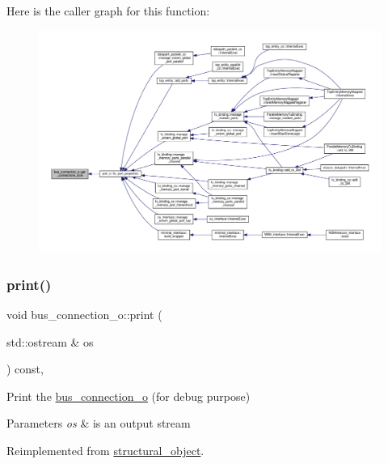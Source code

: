 Here is the caller graph for this function\+:
\nopagebreak
\begin{figure}[H]
\begin{center}
\leavevmode
\includegraphics[width=350pt]{d3/dfb/classbus__connection__o_a33bc2eb332f138bce27623ab76ce1305_icgraph}
\end{center}
\end{figure}
\mbox{\label{classbus__connection__o_ae96b465789da7122ed409f31bc43421a}} 
\subsubsection{\texorpdfstring{print()}{print()}}
{\footnotesize\ttfamily void bus\+\_\+connection\+\_\+o\+::print (\begin{DoxyParamCaption}\item[{std\+::ostream \&}]{os }\end{DoxyParamCaption}) const\hspace{0.3cm}{\ttfamily [override]}, {\ttfamily [virtual]}}



Print the \hyperlink{classbus__connection__o}{bus\+\_\+connection\+\_\+o} (for debug purpose) 


\begin{DoxyParams}{Parameters}
{\em os} & is an output stream \\
\hline
\end{DoxyParams}


Reimplemented from \hyperlink{classstructural__object_a6770e169cf00f814a35b2939ec8f92eb}{structural\+\_\+object}.



